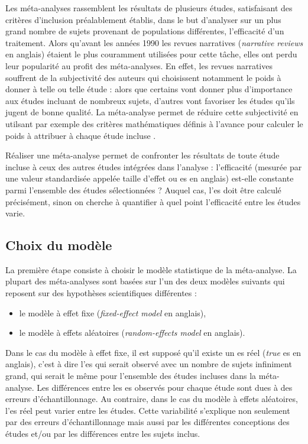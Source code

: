 Les méta-analyses rassemblent les résultats de plusieurs études, satisfaisant des critères d'inclusion préalablement établis, dans le but d'analyser
sur un plus grand nombre de sujets provenant de populations différentes, l'efficacité d'un traitement. Alors qu'avant les années 1990 les revues narratives
(\textit{narrative reviews} en anglais) étaient le plus couramment utilisées pour cette tâche, elles ont perdu leur popularité au profit des méta-analyses.
En effet, les revues narratives souffrent de la subjectivité des auteurs qui choisissent notamment le poids à donner à telle ou telle étude : alors que certains
vont donner plus d'importance aux études incluant de nombreux sujets, d'autres vont favoriser les études qu'ils jugent de bonne qualité. La méta-analyse permet 
de réduire cette subjectivité en utilsant par exemple des critères mathématiques définis à l'avance pour calculer le poids à attribuer à chaque étude incluse
\citep{Borenstein2009}.

Réaliser une méta-analyse permet de confronter les résultats de toute étude incluse à ceux des autres études intégrées dans l'analyse : l'efficacité (mesurée par 
une valeur standardisée appelée taille d'effet ou \gls{es} en anglais) est-elle constante parmi l'ensemble des études sélectionnées ? 
Auquel cas, l'\gls{es} doit être calculé précisément, sinon on cherche à quantifier à quel point l'efficacité entre les études varie.

\subsection{Choix du modèle}

La première étape consiste à choisir le modèle statistique de la méta-analyse. La plupart des méta-analyses sont basées sur l'un des deux modèles 
suivants qui reposent sur des hypothèses scientifiques différentes \citep{Borenstein2009} :
\renewcommand{\labelitemi}{$\bullet$}
\begin{itemize}
\item le modèle à effet fixe (\textit{fixed-effect model} en anglais),
\item le modèle à effets aléatoires (\textit{random-effects model} en anglais).
\end{itemize}

Dans le cas du modèle à effet fixe, il est supposé qu'il existe un \gls{es} réel (\textit{true} \gls{es} en anglais), c'est à dire l'\gls{es} qui serait
observé avec un nombre de sujets infiniment grand, qui serait le même pour l'ensemble des études incluses dans la méta-analyse. Les différences entre
les \gls{es} observés pour chaque étude sont dues à des erreurs d'échantillonnage. Au contraire, dans le cas du modèle à effets aléatoires, 
l'\gls{es} réel peut varier entre les études. Cette variabilité s'explique non seulement par des erreurs d'échantillonnage mais aussi par 
les différentes conceptions des études et/ou par les différences entre les sujets inclus.

